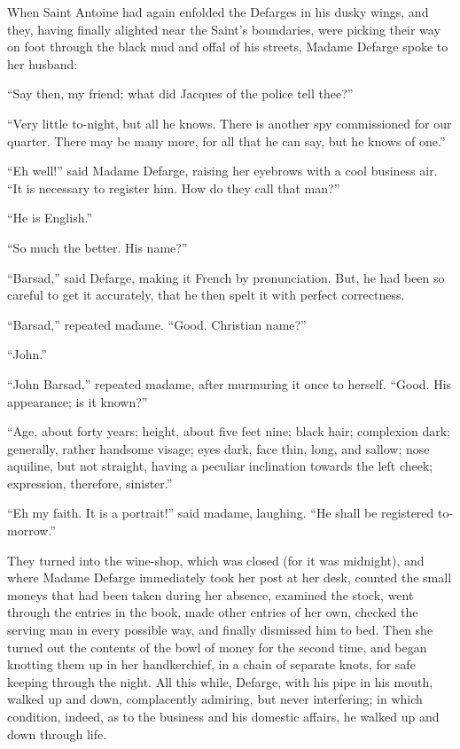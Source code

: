 When Saint Antoine had again enfolded the Defarges in his dusky wings,
and they, having finally alighted near the Saint's boundaries, were
picking their way on foot through the black mud and offal of his streets,
Madame Defarge spoke to her husband:

``Say then, my friend; what did Jacques of the police tell thee?''

``Very little to-night, but all he knows.  There is another spy
commissioned for our quarter.  There may be many more, for all that
he can say, but he knows of one.''

``Eh well!'' said Madame Defarge, raising her eyebrows with a cool
business air.  ``It is necessary to register him.  How do they
call that man?''

``He is English.''

``So much the better.  His name?''

``Barsad,'' said Defarge, making it French by pronunciation.  But,
he had been so careful to get it accurately, that he then spelt
it with perfect correctness.

``Barsad,'' repeated madame.  ``Good.  Christian name?''

``John.''

``John Barsad,'' repeated madame, after murmuring it once to herself.
``Good.  His appearance; is it known?''

``Age, about forty years; height, about five feet nine; black hair;
complexion dark; generally, rather handsome visage; eyes dark, face thin,
long, and sallow; nose aquiline, but not straight, having a peculiar
inclination towards the left cheek; expression, therefore, sinister.''

``Eh my faith.  It is a portrait!'' said madame, laughing.  ``He shall
be registered to-morrow.''

They turned into the wine-shop, which was closed (for it was midnight),
and where Madame Defarge immediately took her post at her desk,
counted the small moneys that had been taken during her absence,
examined the stock, went through the entries in the book, made other
entries of her own, checked the serving man in every possible way,
and finally dismissed him to bed.  Then she turned out the contents
of the bowl of money for the second time, and began knotting them up
in her handkerchief, in a chain of separate knots, for safe keeping
through the night.  All this while, Defarge, with his pipe in his mouth,
walked up and down, complacently admiring, but never interfering;
in which condition, indeed, as to the business and his domestic affairs,
he walked up and down through life.

